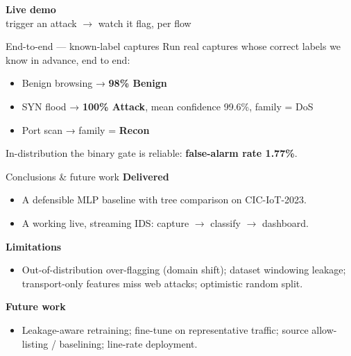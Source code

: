 \documentclass[aspectratio=169]{beamer}
\begin{document}
\begin{frame}[plain]
  \centering
  \vfill
  {\Huge\textbf{Live demo}}\\[1.2em]
  {\large trigger an attack $\to$ watch it flag, per flow}
  \vfill
\end{frame}

\begin{frame}{End-to-end — known-label captures}
  Run real captures whose correct labels we know in advance, end to end:
  \begin{itemize}
    \item Benign browsing → \textbf{98\% Benign}
    \item SYN flood → \textbf{100\% Attack}, mean confidence 99.6\%, family = DoS
    \item Port scan → family = \textbf{Recon}
  \end{itemize}
  \vspace{0.6em}
  In-distribution the binary gate is reliable: \textbf{false-alarm rate 1.77\%}.
\end{frame}

\begin{frame}{Conclusions \& future work}
  \textbf{Delivered}
  \begin{itemize}\footnotesize
    \item A defensible MLP baseline with tree comparison on CIC-IoT-2023.
    \item A working live, streaming IDS: capture $\to$ classify $\to$ dashboard.
  \end{itemize}
  \textbf{Limitations}
  \begin{itemize}\footnotesize
    \item Out-of-distribution over-flagging (domain shift); dataset windowing leakage;
          transport-only features miss web attacks; optimistic random split.
  \end{itemize}
  \textbf{Future work}
  \begin{itemize}\footnotesize
    \item Leakage-aware retraining; fine-tune on representative traffic;
          source allow-listing / baselining; line-rate deployment.
  \end{itemize}
\end{frame}
\end{document}
